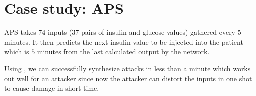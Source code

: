 \section{Case study: APS}

\ac{APS} takes 74 inputs ($37$ pairs of insulin and glucose values) gathered every $5$ minutes. 
It then predicts the next insulin value to be injected into the patient which is $5$ minutes from the last calculated output by the network. 


Using \tool, we can successfully synthesize attacks in less than a minute which works out well for an attacker since now the attacker can distort the inputs in one shot to cause damage in short time. 






